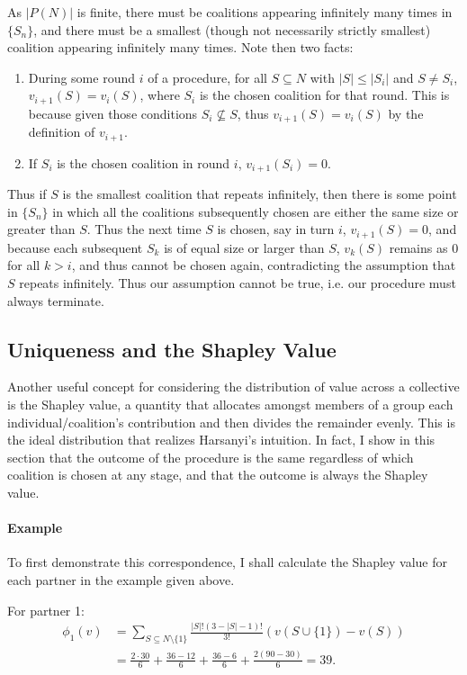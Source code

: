 \documentclass[12pt]{article}
\begin{document}
As $|P(N)|$ is finite, there must be coalitions appearing infinitely many times
in $\{S_n\}$, and there must be a smallest (though not necessarily strictly
smallest) coalition appearing infinitely many times. Note then two facts:
\begin{enumerate}
\item During some round $i$ of a procedure, for all $S \subseteq N$ with $|S|
  \leq |S_i|$ and $S \neq S_i$, $v_{i+1}(S) = v_i(S)$,
  where $S_i$ is the chosen coalition for that
  round. This is because given those conditions $S_i \not\subseteq S$, thus
  $v_{i+1}(S) = v_i(S)$ by the definition of $v_{i+1}$.
\item If $S_i$ is the chosen coalition in round $i$, $v_{i+1}(S_i) = 0$.
\end{enumerate}
Thus if $S$ is the smallest coalition that repeats infinitely, then there is some
point in $\{S_n\}$ in which all the coalitions subsequently chosen are either the
same size or greater than $S$. Thus the next time $S$ is chosen, say in turn
$i$, $v_{i+1}(S) = 0$, and because each subsequent $S_k$ is of equal size or
larger than $S$, $v_k(S)$ remains as 0 for all $k > i$, and thus cannot be chosen
again, contradicting the assumption that $S$ repeats infinitely. Thus our
assumption cannot be true, i.e. our procedure must always terminate.

\subsection*{Uniqueness and the Shapley Value}


Another useful concept for considering the distribution of value across a
collective is the Shapley value, a quantity that allocates amongst members of a
group each individual/coalition's contribution and then divides the remainder
evenly. This is the ideal distribution that realizes Harsanyi's intuition.
In fact, I show in this section that the outcome of the
procedure is the same regardless of which coalition is chosen at any stage,
and that the outcome is always the Shapley value.

\paragraph{Example}

To first demonstrate this correspondence, I shall calculate the Shapley value
for each partner in the example given above.

For partner 1:
\begin{align*}
  \phi_1(v)
  & = \sum_{S\subseteq N\setminus \{1\}}\frac{|S|!(3-|S|-1)!}{3!}(v(S\cup \{1\})-
    v(S))\\
  & = \frac{2\cdot 30}{6} + \frac{36-12}{6} + \frac{36-6}{6} +
    \frac{2(90-30)}{6} = 39.
\end{align*}
\end{document}
